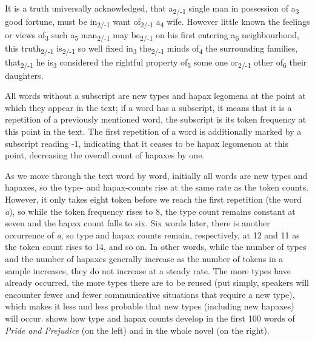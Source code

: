 \begin{exe}
\ex It is a truth universally acknowledged, that a\textsubscript{2/-1} single man in possession of a\textsubscript{3} good fortune, must be in\textsubscript{2/-1} want of\textsubscript{2/-1} a\textsubscript{4} wife. However little known the feelings  or views of\textsubscript{3} such a\textsubscript{5} man\textsubscript{2/-1} may be\textsubscript{2/-1} on his first entering a\textsubscript{6} neighbourhood, this truth\textsubscript{2/-1} is\textsubscript{2/-1} so well fixed in\textsubscript{3} the\textsubscript{2/-1} minds of\textsubscript{4} the surrounding families, that\textsubscript{2/-1} he is\textsubscript{3} considered the rightful property of\textsubscript{5} some one or\textsubscript{2/-1} other of\textsubscript{6} their daughters.
\label{ex:prideandprejudicesample}
\end{exe}

All words without a subscript are new types  and hapax  legomena at the point at which they appear in the text; if a word has a subscript, it means that it is a repetition of a previously mentioned word, the subscript is its token  frequency  at this point in the text. The first repetition of a word is additionally marked by a subscript reading -1, indicating that it ceases to be hapax legomenon at this point, decreasing the overall count of hapaxes by one.

As we move through the text word by word, initially all words are new types  and hapaxes,  so the type- and hapax\hyp{}counts  rise at the same rate as the token counts. However, it only takes eight token  before we reach the first repetition (the word \textit{a}), so while the token frequency  rises to 8, the type count remains constant at seven and the hapax count falls to six. Six words later, there is another occurrence of \textit{a}, so type and hapax  counts remain, respectively, at 12 and 11 as the token  count rises to 14, and so on. In other words, while the number of types and the number of hapaxes  generally increase as the number of tokens in a sample increases, they do not increase at a steady rate. The more types have already occurred, the more types  there are to be reused (put simply, speakers will encounter fewer and fewer communicative situations that require a new type), which makes it less and less probable that new types (including new hapaxes)  will occur.  shows how type and hapax counts develop in the first 100 words of \textit{Pride and Prejudice} (on the left) and in the whole novel  (on the right).

